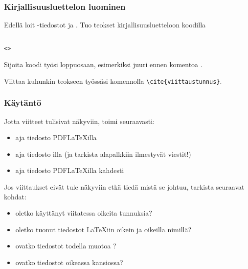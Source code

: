 \begin{fframe}
    \frametitle{Kirjallisuusluettelon luominen}
    \begin{harj}
        Edellä loit \BibTeX-tiedostot  ja . Tuo teokset kirjallisuusluetteloon koodilla 
        \begin{lstlisting}

<>
        \end{lstlisting}
        Sijoita koodi työsi loppuosaan, esimerkiksi juuri ennen komentoa \lstinline--.
    \end{harj}
    \begin{harj}
        Viittaa kuhunkin teokseen työssäsi komennolla \lstinline-\cite{viittaustunnus}-.
    \end{harj}
\end{fframe}
\begin{fframe}
    \frametitle{Käytäntö}
    Jotta viitteet tulisivat näkyviin, toimi seuraavasti:
    \begin{itemize}[<+->]
        \item aja tiedosto PDFLaTeXilla
        \item aja tiedosto \BibTeX{}illa (ja tarkista alapalkkiin ilmestyvät viestit!)
        \item aja tiedosto PDFLaTeXilla kahdesti
    \end{itemize} 
    \pause
    Jos viittaukset eivät tule näkyviin etkä tiedä mistä se johtuu, tarkista seuraavat kohdat:
    \begin{itemize}
        \item oletko käyttänyt viitatessa oikeita tunnuksia?
        \item oletko tuonut tiedostot \LaTeX iin oikein ja oikeilla nimillä?
        \item ovatko tiedostot todella muotoa ?
        \item ovatko tiedostot oikeassa kansiossa?
    \end{itemize}
\end{fframe}

